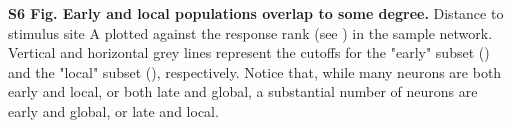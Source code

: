 \documentclass[9pt,lineno,onehalfspacing]{elife}
\begin{document}
\textbf{S6 Fig. Early and local populations overlap to some degree.}
Distance to stimulus site A plotted against the response rank (see ) in the sample network. Vertical and horizontal grey lines represent the cutoffs for the "early" subset () and the "local" subset (), respectively. Notice that, while many neurons are both early and local, or both late and global, a substantial number of neurons are early and global, or late and local.
\end{document}
